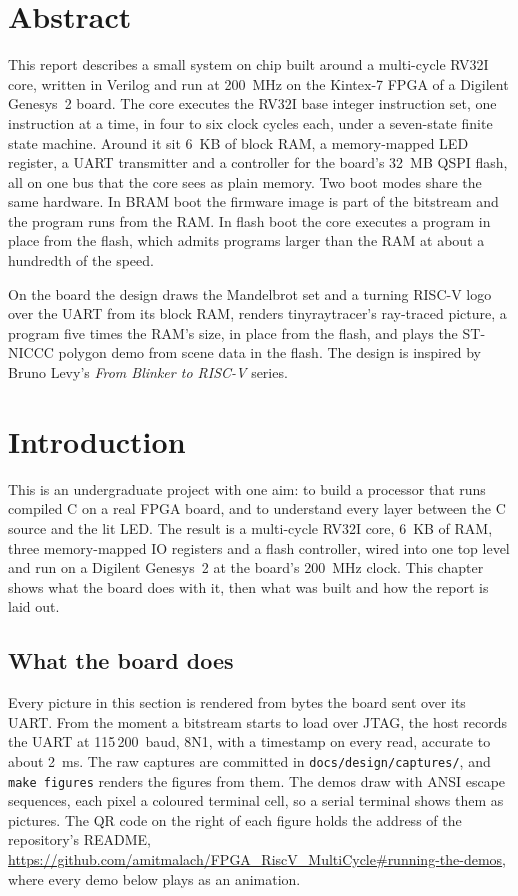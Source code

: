 \documentclass[11pt,a4paper]{report}
\newcommand{\demourl}{https://github.com/amitmalach/FPGA_RiscV_MultiCycle\#running-the-demos}
\begin{document}
\chapter*{Abstract}

This report describes a small system on chip built around a multi-cycle RV32I core, written
in Verilog and run at 200~MHz on the Kintex-7 FPGA of a Digilent Genesys~2 board. The core
executes the RV32I base integer instruction set, one instruction at a time, in four to six
clock cycles each, under a seven-state finite state machine. Around it sit 6~KB of block RAM,
a memory-mapped LED register, a UART transmitter and a controller for the board's 32~MB QSPI
flash, all on one bus that the core sees as plain memory. Two boot modes share the same
hardware. In BRAM boot the firmware image is part of the bitstream and the program runs from
the RAM. In flash boot the core executes a program in place from the flash, which admits
programs larger than the RAM at about a hundredth of the speed.

On the board the design draws the Mandelbrot set and a turning RISC-V logo over the UART from
its block RAM, renders tinyraytracer's ray-traced picture, a program five times the RAM's
size, in place from the flash, and plays the ST-NICCC polygon demo from scene data in the
flash. The design is inspired by Bruno Levy's \emph{From Blinker
to RISC-V} series.

\tableofcontents
\cleardoublepage
{}

\chapter{Introduction}
\label{ch:intro}

This is an undergraduate project with one aim: to build a processor that runs compiled C on a
real FPGA board, and to understand every layer between the C source and the lit LED. The
result is a multi-cycle RV32I core, 6~KB of RAM, three memory-mapped IO registers and a flash
controller, wired into one top level and run on a Digilent Genesys~2 at the board's 200~MHz
clock. This chapter shows what the board does with it, then what was built and how the report
is laid out.

\section{What the board does}
\label{sec:showcase}

Every picture in this section is rendered from bytes the board sent over its UART. From the
moment a bitstream starts to load over JTAG, the host records the UART at 115\,200~baud,
8N1, with a timestamp on every read, accurate to about 2~ms. The raw captures are committed
in \texttt{docs/design/captures/}, and \texttt{make figures} renders the figures from them.
The demos draw with ANSI escape sequences, each pixel a coloured terminal cell, so a serial
terminal shows them as pictures. The QR code on the right of each figure holds the address of
the repository's README, \url{\demourl}, where every demo below plays as an animation.
\end{document}
